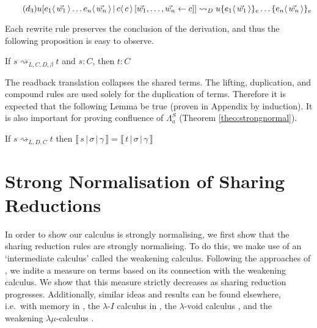 \documentclass[a4paper,UKenglish,cleveref, autoref]{lipics-v2019}
\newcommand{\FALC}{\Lambda^{S}_{a}}
\newcommand{\share}[3]{#1 [#2 \leftarrow #3]}
\newcommand{\dist}[5]{#1 [ #2 \, \vert \, \fakedist{#4}{#5} \, #3 ]}
\newcommand{\fakedist}[2]{#1 \langle \, #2 \, \rangle}
\newcommand{\exor}[3]{#1 \{ \fakedist{#2}{#3} \}_{e}}
\newcommand{\readbackwmap}[3]{\llbracket \, #1 \, \vert \, #2 \, \vert \, #3  \, \rrbracket }
\newcommand{\distrule}{d}
\newcommand{\sharerule}{\triangle}
\newcommand{\lamrule}{\lambda}
\begin{document}
\begin{equation} \label{red:distelim} \tag{$d_{3}$}
\dist{u}{\fakedist{e_{1}}{\vec{w_{1}}} \dots \fakedist{e_{n}}{\vec{w_{n}}}}{\share{}{\vec{w_{1}}, \dots, \vec{w_{n}}}{c}}{c}{c} \rightsquigarrow_{D} \exor{\exor{u}{e_{1}}{\vec{w_{1}}} \dots}{e_{n}}{\vec{w_{n}}}
\end{equation}
\begin{center}
\drv{ ; -[\lamrule] ; A \rightarrow \drv{A ; -[\sharerule] ; A \wedge A} ; -[\distrule] ; (A \rightarrow A) \wedge (A \rightarrow A)}
\hspace{0.5cm}
\drv{\drv{ ; -[\lamrule] ; A \rightarrow A} \wedge \drv{ ; -[\lamrule] ; A \rightarrow A}}
\end{center}

\noindent Each rewrite rule preserves the conclusion of the derivation, and thus the following proposition is easy to observe.

\begin{proposition}
If $s \rightsquigarrow_{L, C, D, \beta} t$ and $s : C$, then $t : C$
\end{proposition}

\noindent The readback translation collapses the shared terms. The lifting, duplication, and compound rules are used solely for the duplication of terms. Therefore it is expected that the following Lemma be true (proven in Appendix by induction). It is also important for proving confluence of $\FALC$ (Theorem \ref{theo:strongnormal}).

\begin{lemma}
\label{lem:preservesdenotation}
 If $s \rightsquigarrow_{L, D, C} t$ then $\readbackwmap{s}{\sigma}{\gamma} = \readbackwmap{t}{\sigma}{\gamma}$
\end{lemma}

\section{Strong Normalisation of Sharing Reductions}

In order to show our calculus is strongly normalising, we first show that the sharing reduction rules are strongly normalising. To do this, we make use of an `intermediate calculus' called the weakening calculus. Following the approaches of \cite{gundersen2013atomic}, we indite a measure on terms based on its connection with the weakening calculus. We show that this measure strictly decreases as sharing reduction progresses. Additionally, similar ideas and results can be found elsewhere, i.e.\ with memory in \cite{klop1980thesis}, the $\lambda$-$I$ calculus in \cite{barendregt1984lambda}, the $\lambda$-void calculus \cite{kesneraccattoli12}, and the weakening $\lambda\mu$-calculus \cite{he2018atomic}.
\end{document}
